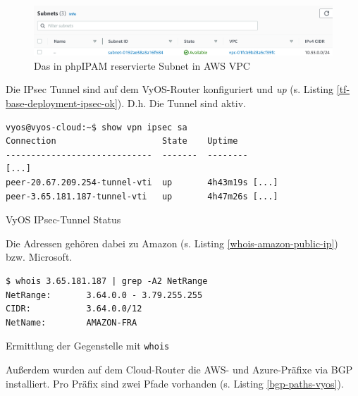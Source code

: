 \begin{figure}[h]
  \centering
  \includegraphics[scale=0.4]{Figures/subnet_aws_reserved_server.png}
  \caption{Das in phpIPAM reservierte Subnet in AWS VPC}
  \label{grafik:subnet_aws_vpc_reserved}
\end{figure}\FloatBarrier
\newpage
Die \gls{IPsec} Tunnel sind auf dem VyOS-Router konfiguriert und \textit{up} (s. Listing \ref{tf-base-deployment-ipsec-ok}). D.h. Die Tunnel sind aktiv.
\begin{listing}[h]
\begin{verbatim}
vyos@vyos-cloud:~$ show vpn ipsec sa
Connection                     State    Uptime
-----------------------------  -------  --------
[...]
peer-20.67.209.254-tunnel-vti  up       4h43m19s [...]
peer-3.65.181.187-tunnel-vti   up       4h47m26s [...]

\end{verbatim}
\caption{VyOS IPsec-Tunnel Status}
\label{tf-base-deployment-ipsec-ok}
\end{listing}\FloatBarrier
Die Adressen gehören dabei zu Amazon (s. Listing \ref{whois-amazon-public-ip}) bzw. Microsoft.
\begin{listing}[h]
\begin{verbatim}
$ whois 3.65.181.187 | grep -A2 NetRange
NetRange:       3.64.0.0 - 3.79.255.255
CIDR:           3.64.0.0/12
NetName:        AMAZON-FRA

\end{verbatim}
\caption{Ermittlung der Gegenstelle mit \texttt{whois}}
\label{whois-amazon-public-ip}
\end{listing}\FloatBarrier
Außerdem wurden auf dem Cloud-Router die AWS- und Azure-Präfixe via \gls{BGP} installiert. Pro Präfix sind zwei Pfade vorhanden (s. Listing \ref{bgp-paths-vyos}).

